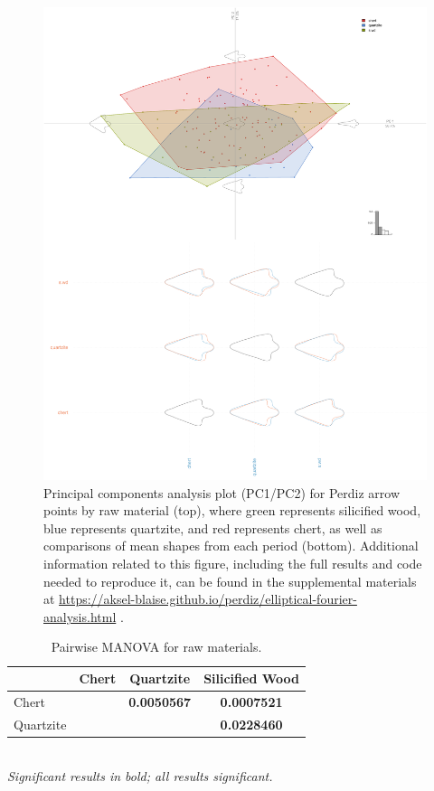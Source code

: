 \documentclass[review]{elsarticle}
\begin{document}
\begin{figure}[!]\centering
\includegraphics[width=\linewidth]{rawmat.pdf}
\caption{Principal components analysis plot (PC1/PC2) for Perdiz arrow points by raw material (top), where green represents silicified wood, blue represents quartzite, and red represents chert, as well as comparisons of mean shapes from each period (bottom). Additional information related to this figure, including the full results and code needed to reproduce it, can be found in the supplemental materials at \href{https://aksel-blaise.github.io/perdiz/elliptical-fourier-analysis.html}{https://aksel-blaise.github.io/perdiz/elliptical-fourier-analysis.html} \citep{RN8980}.}
\label{fig:gmrawmat}
\end{figure}

\begin{table}[tbh]\centering
\footnotesize
\caption{Pairwise MANOVA for raw materials.}
\centering
\begin{tabular}{lccc}
\hline
 & Chert & Quartzite & Silicified Wood\\
\hline
Chert & & \textbf{0.0050567} & \textbf{0.0007521}\\
Quartzite & & & \textbf{0.0228460}\\
\hline
\end{tabular}\\
\textit{Significant results in bold; all results significant.}
\label{tab:tab.shape.raw}
\end{table}
\end{document}
